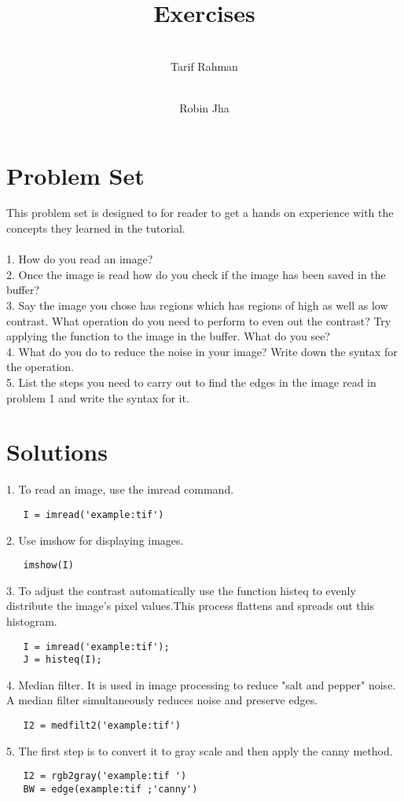 \documentclass[12pt]{article}
\title{Exercises}
\author{
   \\Tarif Rahman
  \and
    \\Robin Jha}
\begin{document}
\maketitle
\section{Problem Set}
This problem set is designed to for reader to get a hands on experience with the concepts they learned in the tutorial.
  \\ \\1. How do you read an image?
  \vspace {5 mm}
  \\2. Once the image is read how do you check if the image has been saved in the buffer? 
  \vspace {5 mm}
  \\3. Say the image you chose has regions which has regions of high as well as low contrast. What operation do you need to perform to even out the contrast? Try applying the function to the image in the buffer. What do you see?
  \vspace {5 mm}
  \\4. What do you do to reduce the noise in your image? Write down the syntax for the operation.
   \vspace {5 mm}
  \\5. List the steps you need to carry out to find the edges in the image read in problem 1 and write the syntax for it.
   \vspace {10 mm}
\section{Solutions}
1. To read an image, use the imread command.
   \vspace {1 mm}
   \begin{verbatim}
   I = imread('example:tif')
   \end{verbatim}
   \vspace {5 mm}
2. Use imshow for displaying images.
   \vspace {1 mm}
   \begin{verbatim}
   imshow(I)
   \end{verbatim}
   \vspace {5 mm}
3. To adjust the contrast automatically use the function histeq to evenly distribute the    image's pixel values.This process flattens and spreads out this histogram.
	\vspace {1 mm}
   \begin{verbatim}
   I = imread('example:tif');
   J = histeq(I);
   \end{verbatim}
   \vspace {5 mm}
4. Median filter. It is used in image processing to reduce "salt and pepper" noise. A median filter simultaneously reduces noise and preserve edges. 
\vspace {1 mm}
   \begin{verbatim}
   I2 = medfilt2('example:tif')
   \end{verbatim}
   \vspace {5 mm}
5. The first step is to convert it to gray scale and then apply the canny method.
\vspace {1 mm}
\begin{verbatim}
   I2 = rgb2gray('example:tif ')
   BW = edge(example:tif ;'canny')
   \end{verbatim}
  
\end{document}
